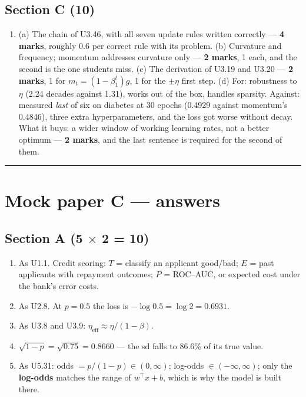\documentclass[11pt,a4paper]{article}
\begin{document}
\subsection*{Section C (10)}
\begin{enumerate}[label=\textbf{\arabic*.}, leftmargin=*, start=10]
\item (a) The chain of U3.46, with all seven update rules written correctly ---
  \textbf{4 marks}, roughly 0.6 per correct rule with its problem.
  (b) Curvature and frequency; momentum addresses curvature only ---
  \textbf{2 marks}, 1 each, and the second is the one students miss.
  (c) The derivation of U3.19 and U3.20 --- \textbf{2 marks}, 1 for
  $m_t = (1-\beta_1^t)g$, 1 for the $\pm\eta$ first step.
  (d) For: robustness to $\eta$ (2.24 decades against 1.31), works out of the
  box, handles sparsity. Against: measured \emph{last} of six on diabetes at 30
  epochs (0.4929 against momentum's 0.4846), three extra hyperparameters, and
  the loss got worse without decay. What it buys: a wider window of working
  learning rates, not a better optimum --- \textbf{2 marks}, and the last
  sentence is required for the second of them.
\end{enumerate}

\vspace{0.4em}\hrule

\section*{Mock paper C --- answers}

\subsection*{Section A (5 $\times$ 2 = 10)}
\begin{enumerate}[label=\textbf{\arabic*.}, leftmargin=*]
\item As U1.1. Credit scoring: $T$ = classify an applicant good/bad;
  $E$ = past applicants with repayment outcomes; $P$ = ROC--AUC, or expected
  cost under the bank's error costs.
\item As U2.8. At $p = 0.5$ the loss is $-\log 0.5 = \log 2 = \mathbf{0.6931}$.
\item As U3.8 and U3.9: $\eta_{\text{eff}} \approx \eta/(1-\beta)$.
\item $\sqrt{1-p} = \sqrt{0.75} = \mathbf{0.8660}$ --- the sd falls to 86.6\%
  of its true value.
\item As U5.31: odds $= p/(1-p) \in (0,\infty)$; log-odds
  $\in (-\infty,\infty)$; only the \textbf{log-odds} matches the range of
  $w^\top x + b$, which is why the model is built there.
\end{enumerate}
\end{document}
